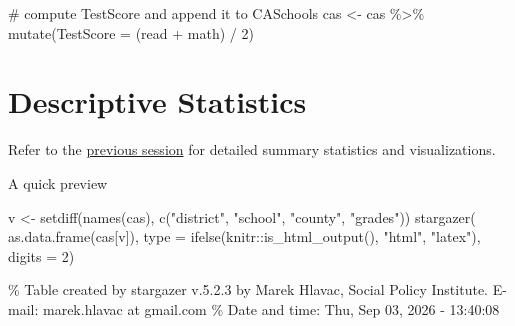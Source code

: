 \documentclass[
  12pt,
  a4paper,
]{scrbook}
\newenvironment{Shaded}{\begin{snugshade}}{\end{snugshade}}
\newcommand{\AttributeTok}[1]{\textcolor[rgb]{0.40,0.45,0.13}{#1}}
\newcommand{\CommentTok}[1]{\textcolor[rgb]{0.37,0.37,0.37}{#1}}
\newcommand{\DecValTok}[1]{\textcolor[rgb]{0.68,0.00,0.00}{#1}}
\newcommand{\FunctionTok}[1]{\textcolor[rgb]{0.28,0.35,0.67}{#1}}
\newcommand{\NormalTok}[1]{\textcolor[rgb]{0.00,0.23,0.31}{#1}}
\newcommand{\OtherTok}[1]{\textcolor[rgb]{0.00,0.23,0.31}{#1}}
\newcommand{\SpecialCharTok}[1]{\textcolor[rgb]{0.37,0.37,0.37}{#1}}
\newcommand{\StringTok}[1]{\textcolor[rgb]{0.13,0.47,0.30}{#1}}
\theoremstyle{plain}
\theoremstyle{definition}
\theoremstyle{remark}
\begin{document}
\begin{Shaded}
\begin{Highlighting}[]
\CommentTok{\# compute TestScore and append it to CASchools}
\NormalTok{cas }\OtherTok{\textless{}{-}}\NormalTok{ cas }\SpecialCharTok{\%\textgreater{}\%}
  \FunctionTok{mutate}\NormalTok{(}\AttributeTok{TestScore =}\NormalTok{ (read }\SpecialCharTok{+}\NormalTok{ math) }\SpecialCharTok{/} \DecValTok{2}\NormalTok{)}
\end{Highlighting}
\end{Shaded}

\section{Descriptive Statistics}\label{descriptive-statistics}

Refer to the
\hyperref[descriptive-analysis-and-data-visualization-with-caschools]{previous
session} for detailed summary statistics and visualizations.

A quick preview

\begin{Shaded}
\begin{Highlighting}[]
\NormalTok{v }\OtherTok{\textless{}{-}} \FunctionTok{setdiff}\NormalTok{(}\FunctionTok{names}\NormalTok{(cas), }\FunctionTok{c}\NormalTok{(}\StringTok{"district"}\NormalTok{, }\StringTok{"school"}\NormalTok{, }\StringTok{"county"}\NormalTok{, }\StringTok{"grades"}\NormalTok{))}
\FunctionTok{stargazer}\NormalTok{(}
  \FunctionTok{as.data.frame}\NormalTok{(cas[v]), }
  \AttributeTok{type =} \FunctionTok{ifelse}\NormalTok{(knitr}\SpecialCharTok{::}\FunctionTok{is\_html\_output}\NormalTok{(), }\StringTok{"html"}\NormalTok{, }\StringTok{"latex"}\NormalTok{), }
  \AttributeTok{digits =} \DecValTok{2}\NormalTok{)}
\end{Highlighting}
\end{Shaded}

\% Table created by stargazer v.5.2.3 by Marek Hlavac, Social Policy
Institute. E-mail: marek.hlavac at gmail.com \% Date and time: Thu, Sep
03, 2026 - 13:40:08
\end{document}
